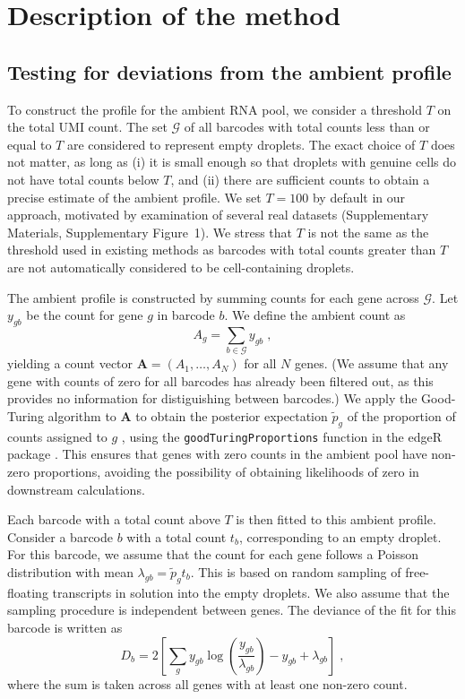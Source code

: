 \documentclass[10pt,letterpaper]{article}
\newcommand{\code}[1]{\texttt{#1}}
\newcommand{\suppfignegative}{1}
\begin{document}
\section*{Description of the method}

\subsection*{Testing for deviations from the ambient profile}
To construct the profile for the ambient RNA pool, we consider a threshold $T$ on the total UMI count.
The set $\mathcal{G}$ of all barcodes with total counts less than or equal to $T$ are considered to represent empty droplets.
The exact choice of $T$ does not matter, as long as (i) it is small enough so that droplets with genuine cells do not have total counts below $T$,
and (ii) there are sufficient counts to obtain a precise estimate of the ambient profile.
We set $T=100$ by default in our approach, motivated by examination of several real datasets (Supplementary Materials, Supplementary Figure~\suppfignegative{}).
We stress that $T$ is not the same as the threshold used in existing methods as barcodes with total counts greater than $T$ are not automatically considered to be cell-containing droplets.

The ambient profile is constructed by summing counts for each gene across $\mathcal{G}$.
Let $y_{gb}$ be the count for gene $g$ in barcode $b$.
We define the ambient count as 
\[
    A_{g} = \sum_{b \in \mathcal{G}} y_{gb} \;,
\]
yielding a count vector $\mathbf{A} = (A_1, \dots, A_N)$ for all $N$ genes.
(We assume that any gene with counts of zero for all barcodes has already been filtered out, as this provides no information for distiguishing between barcodes.)
We apply the Good-Turing algorithm to $\mathbf{A}$ to obtain the posterior expectation $\tilde{p}_g$ of the proportion of counts assigned to $g$ \cite{gale1995good}, using the \code{goodTuringProportions} function in the \textsf{edgeR} package \cite{robinson2010edgeR}.
This ensures that genes with zero counts in the ambient pool have non-zero proportions, avoiding the possibility of obtaining likelihoods of zero in downstream calculations.

Each barcode with a total count above $T$ is then fitted to this ambient profile.
Consider a barcode $b$ with a total count $t_b$, corresponding to an empty droplet.
For this barcode, we assume that the count for each gene follows a Poisson distribution with mean $\lambda_{gb} = \tilde{p}_g t_b$.
This is based on random sampling of free-floating transcripts in solution into the empty droplets.
We also assume that the sampling procedure is independent between genes.
The deviance of the fit for this barcode is written as
\[
    D_b = 2 \left[ \sum_{g} y_{gb} \log\left(\frac{y_{gb}}{\lambda_{gb}}\right) - y_{gb} + \lambda_{gb} \right] \;,
\]
where the sum is taken across all genes with at least one non-zero count.
\end{document}
